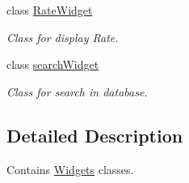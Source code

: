 \begin{DoxyCompactItemize}
class \hyperlink{classGui_1_1Widgets_1_1RateWidget}{Rate\+Widget}
\begin{DoxyCompactList}\small\item\em Class for display Rate. \end{DoxyCompactList}\item 
class \hyperlink{classGui_1_1Widgets_1_1searchWidget}{search\+Widget}
\begin{DoxyCompactList}\small\item\em Class for search in database. \end{DoxyCompactList}\end{DoxyCompactItemize}


\subsection{Detailed Description}
Contains \hyperlink{namespaceGui_1_1Widgets}{Widgets} classes. 
